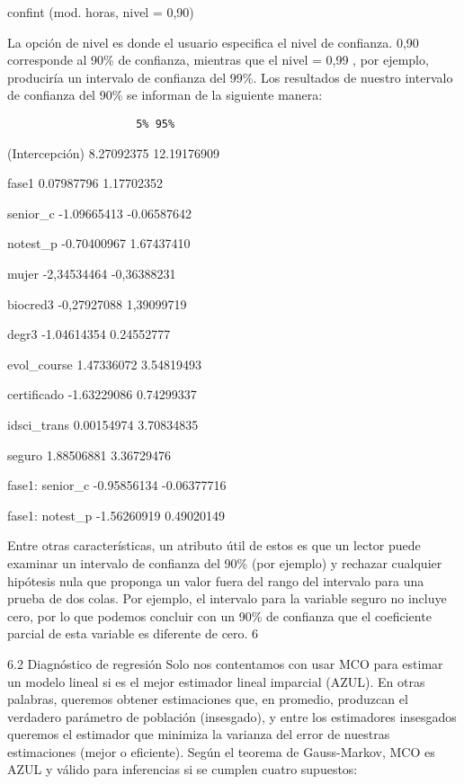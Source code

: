 \documentclass[
]{book}
\begin{document}
confint (mod. horas, nivel = 0,90)

La opción de nivel es donde el usuario especifica el nivel de confianza. 0,90 corresponde al 90\% de confianza, mientras que el nivel = 0,99 , por ejemplo, produciría un intervalo de confianza del 99\%. Los resultados de nuestro intervalo de confianza del 90\% se informan de la siguiente manera:

\begin{verbatim}
                    5% 95%
\end{verbatim}

(Intercepción) 8.27092375 12.19176909

fase1 0.07987796 1.17702352

senior\_c -1.09665413 -0.06587642

notest\_p -0.70400967 1.67437410

mujer -2,34534464 -0,36388231

biocred3 -0,27927088 1,39099719

degr3 -1.04614354 0.24552777

evol\_course 1.47336072 3.54819493

certificado -1.63229086 0.74299337

idsci\_trans 0.00154974 3.70834835

seguro 1.88506881 3.36729476

fase1: senior\_c -0.95856134 -0.06377716

fase1: notest\_p -1.56260919 0.49020149

Entre otras características, un atributo útil de estos es que un lector puede examinar un intervalo de confianza del 90\% (por ejemplo) y rechazar cualquier hipótesis nula que proponga un valor fuera del rango del intervalo para una prueba de dos colas. Por ejemplo, el intervalo para la variable seguro no incluye cero, por lo que podemos concluir con un 90\% de confianza que el coeficiente parcial de esta variable es diferente de cero. 6

6.2 Diagnóstico de regresión
Solo nos contentamos con usar MCO para estimar un modelo lineal si es el mejor estimador lineal imparcial (AZUL). En otras palabras, queremos obtener estimaciones que, en promedio, produzcan el verdadero parámetro de población (insesgado), y entre los estimadores insesgados queremos el estimador que minimiza la varianza del error de nuestras estimaciones (mejor o eficiente). Según el teorema de Gauss-Markov, MCO es AZUL y válido para inferencias si se cumplen cuatro supuestos:
\end{document}
